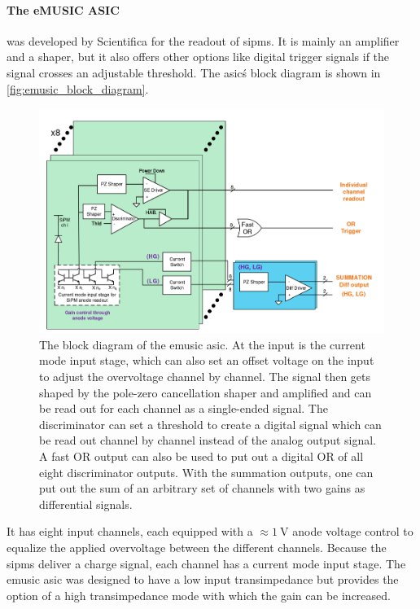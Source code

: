 \paragraph{The eMUSIC ASIC} was developed by Scientifica for the readout of \acp{sipm}.
It is mainly an amplifier and a shaper, but it also offers other options like digital trigger signals if the signal crosses an adjustable threshold.
The \ac{asic}\'s block diagram is shown in \autoref{fig:emusic_block_diagram}.
\begin{figure}
	\centering
	\includegraphics[width=1.\textwidth]{pictures/emusic_block_diagram.png}
	\caption[eMUSIC block diagram]{The block diagram of the \ac{emusic} \ac{asic}. At the input is the current mode input stage, which can also set an offset voltage on the input to adjust the overvoltage channel by channel. The signal then gets shaped by the pole-zero cancellation shaper and amplified and can be read out for each channel as a single-ended signal. The discriminator can set a threshold to create a digital signal which can be read out channel by channel instead of the analog output signal. A fast OR output can also be used to put out a digital OR of all eight discriminator outputs. With the summation outputs, one can put out the sum of an arbitrary set of channels with two gains as differential signals. \cite{gomez}}
	\label{fig:emusic_block_diagram}
\end{figure}
It has eight input channels, each equipped with a $\approx\SI{1}{\volt}$ anode voltage control to equalize the applied overvoltage between the different channels.
Because the \acp{sipm} deliver a charge signal, each channel has a current mode input stage.
The \ac{emusic} \ac{asic} was designed to have a low input transimpedance but provides the option of a high transimpedance mode with which the gain can be increased.
